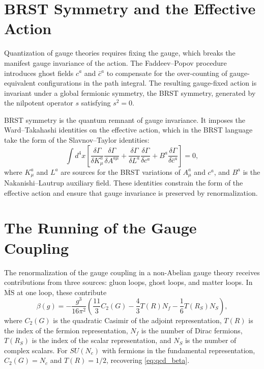 \documentclass[11pt, twoside, openright]{book}
\theoremstyle{dotted}
\theoremstyle{definition}
\begin{document}
\section{BRST Symmetry and the Effective Action}

Quantization of gauge theories requires fixing the gauge, which breaks the manifest
gauge invariance of the action. The Faddeev--Popov procedure introduces ghost fields
$c^a$ and $\bar c^a$ to compensate for the over-counting of gauge-equivalent
configurations in the path integral. The resulting gauge-fixed action is invariant
under a global fermionic symmetry, the BRST symmetry, generated by the nilpotent
operator $s$ satisfying $s^2 = 0$.

BRST symmetry is the quantum remnant of gauge invariance. It imposes the Ward--Takahashi
identities on the effective action, which in the BRST language take the form of the
Slavnov--Taylor identities:
\begin{equation}
  \int d^4x \left[
    \frac{\delta\Gamma}{\delta K_\mu^a}\frac{\delta\Gamma}{\delta A^{a\mu}}
    + \frac{\delta\Gamma}{\delta L^a}\frac{\delta\Gamma}{\delta c^a}
    + B^a\frac{\delta\Gamma}{\delta\bar c^a}
  \right] = 0,
  \label{eq:slavnov_taylor}
\end{equation}
where $K_\mu^a$ and $L^a$ are sources for the BRST variations of $A_\mu^a$ and
$c^a$, and $B^a$ is the Nakanishi--Lautrup auxiliary field. These identities
constrain the form of the effective action and ensure that gauge invariance is
preserved by renormalization.

\section{The Running of the Gauge Coupling}

The renormalization of the gauge coupling in a non-Abelian gauge theory receives
contributions from three sources: gluon loops, ghost loops, and matter loops. In
$\overline{\mathrm{MS}}$ at one loop, these contribute
\begin{equation}
  \beta(g) = -\frac{g^3}{16\pi^2}\left(\frac{11}{3}C_2(G) - \frac{4}{3}T(R)N_f
  - \frac{1}{6}T(R_S)N_S\right),
  \label{eq:gauge_beta_general}
\end{equation}
where $C_2(G)$ is the quadratic Casimir of the adjoint representation, $T(R)$ is
the index of the fermion representation, $N_f$ is the number of Dirac fermions,
$T(R_S)$ is the index of the scalar representation, and $N_S$ is the number of
complex scalars. For $SU(N_c)$ with fermions in the fundamental representation,
$C_2(G) = N_c$ and $T(R) = 1/2$, recovering \eqref{eq:qcd_beta}.
\end{document}
